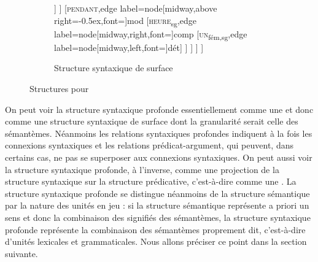 \begin{figure}
\begin{subfigure}[b]{0.5\textwidth}
\begin{forest}
							[\textsc{le}\textsubscript{fém,sg},edge label={node[midway,left,font=\footnotesize]{dét}}]
						]
					]
					[\textsc{pendant},edge label={node[midway,above right=-0.5ex,font=\footnotesize]{mod}}
						[\textsc{heure}\textsubscript{sg},edge label={node[midway,right,font=\footnotesize]{comp}}
							[\textsc{un}\textsubscript{fém,sg},edge label={node[midway,left,font=\footnotesize]{dét}}]
						]
					]
				]
			]
		\end{forest}
		\caption{Structure syntaxique de surface}
	\end{subfigure}
\caption{Structures pour \label{fig:jambe}}
\end{figure}

On peut voir la structure syntaxique profonde essentiellement comme une  et donc comme une structure syntaxique de surface dont la granularité serait celle des sémantèmes. Néanmoins les relations syntaxiques profondes indiquent à la fois les connexions syntaxiques et les relations prédicat-argument, qui peuvent, dans certains cas, ne pas se superposer aux connexions syntaxiques.
On peut aussi voir la structure syntaxique profonde, à l’inverse, comme une projection de la structure syntaxique sur la structure prédicative, c’est-à-dire comme une . La structure syntaxique profonde se distingue néanmoins de la structure sémantique par la nature des unités en jeu : si la structure sémantique représente a priori un sens et donc la combinaison des signifiés des sémantèmes, la structure syntaxique profonde représente la combinaison des sémantèmes proprement dit, c’est-à-dire d’unités lexicales et grammaticales. Nous allons préciser ce point dans la section suivante.

